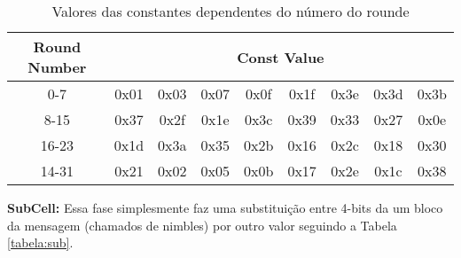 \documentclass[runningheads,a4paper,11pt]{llncs}
\begin{document}
\begin{table}[htbp]
	\centering
	\caption{Valores das constantes dependentes do n\'umero do rounde}
	\begin{tabular}{|c|c|c|c|c|c|c|c|c|}
		\hline
		Round Number & \multicolumn{8}{|c|}{Const Value} \\ \hline
		0-7 & \hspace{1mm}0x01\hspace{1mm} &  \hspace{1mm}0x03\hspace{1mm} &  \hspace{1mm}0x07\hspace{1mm} &  \hspace{1mm}0x0f\hspace{1mm} &  \hspace{1mm}0x1f\hspace{1mm} &  \hspace{1mm}0x3e\hspace{1mm} &  \hspace{1mm}0x3d\hspace{1mm} &  \hspace{1mm}0x3b\hspace{1mm} \\ \hline
		8-15 &   0x37 &  0x2f &  0x1e &  0x3c &  0x39 &  0x33 &  0x27 &  0x0e \\ \hline
		16-23 &   0x1d &  0x3a &  0x35 &  0x2b &  0x16 &  0x2c &  0x18 &  0x30 \\ \hline
		14-31 &   0x21 &  0x02 &  0x05 &  0x0b &  0x17 &  0x2e &  0x1c &  0x38 \\ \hline
	\end{tabular}
	\label{tabela:const}
\end{table}
\noindent
\textbf{SubCell:} Essa fase simplesmente faz uma substitui\c{c}\~ao entre 4-bits da um bloco da mensagem (chamados de nimbles) por outro valor seguindo a Tabela \ref{tabela:sub}.
\end{document}
